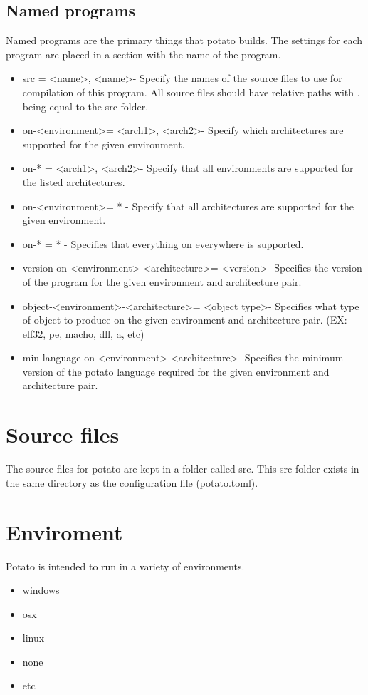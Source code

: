 \documentclass[12pt]{article}
\begin{document}
\subsection {Named programs}
Named programs are the primary things that potato builds. The settings for each program are placed in a section with the name of the program.
\begin{itemize}
\item src = \textless name\textgreater , \textless name\textgreater  - Specify the names of the source files to use for compilation of this program. All source files should have relative paths with . being equal to the src folder.
\item on-\textless environment\textgreater  = \textless arch1\textgreater , \textless arch2\textgreater  - Specify which architectures are supported for the given environment.
\item on-* = \textless arch1\textgreater , \textless arch2\textgreater  - Specify that all environments are supported for the listed architectures.
\item on-\textless environment\textgreater  = * - Specify that all architectures are supported for the given environment.
\item on-* = * - Specifies that everything on everywhere is supported.
\item version-on-\textless environment\textgreater -\textless architecture\textgreater  = \textless version\textgreater  - Specifies the version of the program for the given environment and architecture pair.
\item object-\textless environment\textgreater -\textless architecture\textgreater  = \textless object type\textgreater  - Specifies what type of object to produce on the given environment and architecture pair. (EX: elf32, pe, macho, dll, a, etc)
\item min-language-on-\textless environment\textgreater -\textless architecture\textgreater  - Specifies the minimum version of the potato language required for the given environment and architecture pair.
\end{itemize}

\section {Source files}
The source files for potato are kept in a folder called src. This src folder exists in the same directory as the configuration file (potato.toml).

\section {Enviroment}
Potato is intended to run in a variety of environments.
\begin{itemize}
\item windows
\item osx
\item linux
\item none
\item etc
\end{itemize}
\end{document}
